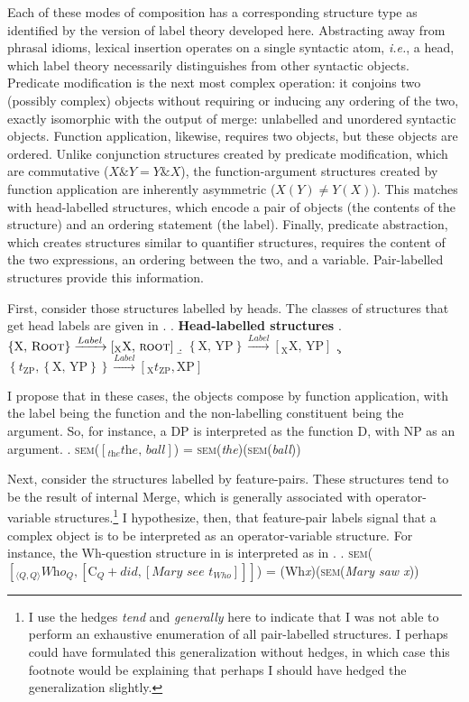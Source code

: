 \documentclass[MilwayThesis]{subfiles}
\begin{document}
Each of these modes of composition has a corresponding structure type as identified by the version of label theory developed here.
Abstracting away from phrasal idioms, lexical insertion operates on a single syntactic atom, \textit{i.e.}, a head, which label theory necessarily distinguishes from other syntactic objects.
Predicate modification is the next most complex operation: it conjoins two (possibly complex) objects without requiring or inducing any ordering of the two, exactly isomorphic with the output of merge: unlabelled and unordered syntactic objects.
Function application, likewise, requires two objects, but these objects are ordered.
Unlike conjunction structures created by predicate modification, which are commutative ($X \& Y = Y \& X$), the function-argument structures created by function application are inherently asymmetric ($X(Y) \neq Y(X)$).
This matches with head-labelled structures, which encode a pair of objects (the contents of the structure) and an ordering statement (the label).
Finally, predicate abstraction, which creates structures similar to quantifier structures, requires the content of the two expressions, an ordering between the two, and a variable.
Pair-labelled structures provide this information.

First, consider those structures labelled by heads.
The classes of structures that get head labels are given in \Next.
\ex. \textbf{Head-labelled structures}
\a. $\left\{ \text{X, }\textsc{Root} \right\} \xrightarrow{Label} \left[_\text{X} \text{X, }\textsc{root}  \right]$
\b. $\left\{ \text{X, YP} \right\} \xrightarrow{Label} \left[_\text{X} \text{X, YP} \right]$
\c. $\left\{ t_\text{ZP}, \left\{ \text{X, YP} \right\} \right\}\xrightarrow{Label}\left[_\text{X} t_\text{ZP}, \text{XP} \right]$

I propose that in these cases, the objects compose by function application, with the label being the function and the non-labelling constituent being the argument.
So, for instance, a DP is interpreted as the function D, with NP as an argument.
\ex. \textsc{sem}($\left[_\textit{the} \textit{the, ball} \right]$) = \textsc{sem}(\textit{the})(\textsc{sem}(\textit{ball}))

Next, consider the structures labelled by feature-pairs.
These structures tend to be the result of internal Merge, which is generally associated with operator-variable structures.\footnote{
	I use the hedges \textit{tend} and \textit{generally} here to indicate that I was not able to perform an exhaustive enumeration of all pair-labelled structures.
	I perhaps could have formulated this generalization without hedges, in which case this footnote would be explaining that perhaps I should have hedged the generalization slightly.
}
I hypothesize, then, that feature-pair labels signal that a complex object is to be interpreted as an operator-variable structure.
For instance, the Wh-question structure in \Next[a] is interpreted as in \Next[b].
\ex. \textsc{sem}($\left[_{\langle Q,Q \rangle} \textit{Who}_Q, \left[ \text{C}_Q+\textit{did}, \left[ \textit{Mary see } t_{Who} \right] \right]  \right]$) = (Wh\textit{x})(\textsc{sem}(\textit{Mary saw x}))
\end{document}
